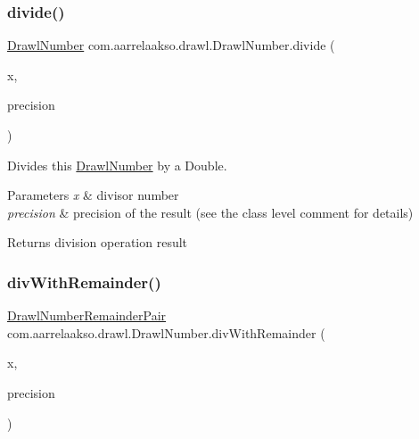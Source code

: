 \subsubsection{\texorpdfstring{divide()}{divide()}\hspace{0.1cm}{\footnotesize\ttfamily [3/3]}}
{\footnotesize\ttfamily \hyperlink{classcom_1_1aarrelaakso_1_1drawl_1_1_drawl_number}{Drawl\+Number} com.\+aarrelaakso.\+drawl.\+Drawl\+Number.\+divide (\begin{DoxyParamCaption}\item[{double}]{x,  }\item[{int}]{precision }\end{DoxyParamCaption})\hspace{0.3cm}{\ttfamily [protected]}}



Divides this \hyperlink{classcom_1_1aarrelaakso_1_1drawl_1_1_drawl_number}{Drawl\+Number} by a Double. 


\begin{DoxyParams}{Parameters}
{\em x} & divisor number \\
\hline
{\em precision} & precision of the result (see the class level comment for details) \\
\hline
\end{DoxyParams}
\begin{DoxyReturn}{Returns}
division operation result 
\end{DoxyReturn}
\mbox{\label{classcom_1_1aarrelaakso_1_1drawl_1_1_drawl_number_a2e6d107711bd1622499bb4f2e8f7c2d3}} 
\subsubsection{\texorpdfstring{div\+With\+Remainder()}{divWithRemainder()}\hspace{0.1cm}{\footnotesize\ttfamily [1/2]}}
{\footnotesize\ttfamily \hyperlink{classcom_1_1aarrelaakso_1_1drawl_1_1_drawl_number_remainder_pair}{Drawl\+Number\+Remainder\+Pair} com.\+aarrelaakso.\+drawl.\+Drawl\+Number.\+div\+With\+Remainder (\begin{DoxyParamCaption}\item[{@Not\+Null \hyperlink{classcom_1_1aarrelaakso_1_1drawl_1_1_drawl_number}{Drawl\+Number}}]{x,  }\item[{int}]{precision }\end{DoxyParamCaption})\hspace{0.3cm}{\ttfamily [protected]}}



